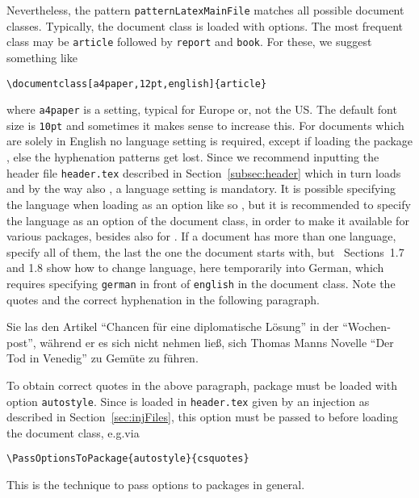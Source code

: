 Nevertheless, the pattern \texttt{patternLatexMainFile} matches all possible document classes. 
Typically, the document class is loaded with options. 
The most frequent class may be \texttt{article} followed by \texttt{report} and \texttt{book}. 
For these, we suggest something like
%
\begin{Verbatim}
\documentclass[a4paper,12pt,english]{article}
\end{Verbatim}
%
where \texttt{a4paper} is a setting, typical for Europe or, not the US\@. 
The default font size is \texttt{10pt} and sometimes it makes sense to increase this. 
For documents which are solely in English no language setting is required, 
except if loading the package , else the hyphenation patterns get lost. 
Since we recommend inputting the header file \texttt{header.tex} 
described in Section~\ref{subsec:header} which in turn loads  and 
by the way also , a language setting is mandatory. 
It is possible specifying the language when loading  as an option 
like so , 
but it is recommended to specify the language as an option of the document class, 
in order to make it available for various packages, 
besides  also for . 
If a document has more than one language, specify all of them, 
the last the one the document starts with, 
but~\cite{BabelP24} Sections~1.7 and 1.8 show how to change language, 
here temporarily into German, 
which requires specifying \texttt{german} in front of \texttt{english} 
in the document class. 
Note the quotes and the correct hyphenation in the following paragraph. 

\begin{otherlanguage}{german}
  Sie las den Artikel \enquote{Chancen für eine diplomatische Lösung} 
  in der "`Wochenpost"', während er es sich nicht nehmen ließ, %
  sich Thomas Manns Novelle "`{Der Tod in Venedig}"' zu Gemüte zu führen. %
\end{otherlanguage}

To obtain correct quotes in the above paragraph, 
package  must be loaded with option \texttt{autostyle}. 
Since  is loaded in \texttt{header.tex} 
given by an injection as described in Section~\ref{sec:injFiles}, 
this option must be passed to  
before loading the document class, e.g.\@ via 
%
\begin{Verbatim}[fontsize=\small]
  \PassOptionsToPackage{autostyle}{csquotes}
\end{Verbatim}
%
This is the technique to pass options to packages in general. 



